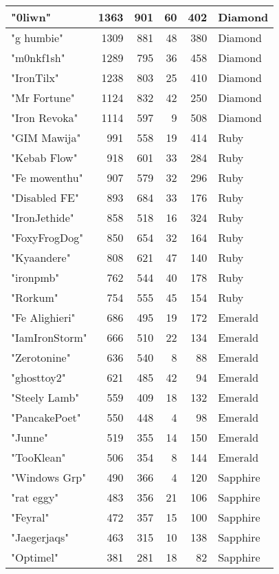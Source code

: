 \documentclass{article}
\begin{document}
\begin{table}[htbp]
\begin{tabular}{|l|r|r|r|r|l|}
"0liwn" & 1363 & 901 & 60 & 402 & Diamond \\ \hline
"g humbie" & 1309 & 881 & 48 & 380 & Diamond \\ \hline
"m0nkf1sh" & 1289 & 795 & 36 & 458 & Diamond \\ \hline
"IronTilx" & 1238 & 803 & 25 & 410 & Diamond \\ \hline
"Mr Fortune" & 1124 & 832 & 42 & 250 & Diamond \\ \hline
"Iron Revoka" & 1114 & 597 & 9 & 508 & Diamond \\ \hline
"GIM Mawija" & 991 & 558 & 19 & 414 & Ruby \\ \hline
"Kebab Flow" & 918 & 601 & 33 & 284 & Ruby \\ \hline
"Fe mowenthu" & 907 & 579 & 32 & 296 & Ruby \\ \hline
"Disabled FE" & 893 & 684 & 33 & 176 & Ruby \\ \hline
"IronJethide" & 858 & 518 & 16 & 324 & Ruby \\ \hline
"FoxyFrogDog" & 850 & 654 & 32 & 164 & Ruby \\ \hline
"Kyaandere" & 808 & 621 & 47 & 140 & Ruby \\ \hline
"ironpmb" & 762 & 544 & 40 & 178 & Ruby \\ \hline
"Rorkum" & 754 & 555 & 45 & 154 & Ruby \\ \hline
"Fe Alighieri" & 686 & 495 & 19 & 172 & Emerald \\ \hline
"IamIronStorm" & 666 & 510 & 22 & 134 & Emerald \\ \hline
"Zerotonine" & 636 & 540 & 8 & 88 & Emerald \\ \hline
"ghosttoy2" & 621 & 485 & 42 & 94 & Emerald \\ \hline
"Steely Lamb" & 559 & 409 & 18 & 132 & Emerald \\ \hline
"PancakePoet" & 550 & 448 & 4 & 98 & Emerald \\ \hline
"Junne" & 519 & 355 & 14 & 150 & Emerald \\ \hline
"TooKlean" & 506 & 354 & 8 & 144 & Emerald \\ \hline
"Windows Grp" & 490 & 366 & 4 & 120 & Sapphire \\ \hline
"rat eggy" & 483 & 356 & 21 & 106 & Sapphire \\ \hline
"Feyral" & 472 & 357 & 15 & 100 & Sapphire \\ \hline
"Jaegerjaqs" & 463 & 315 & 10 & 138 & Sapphire \\ \hline
"Optimel" & 381 & 281 & 18 & 82 & Sapphire \\ \hline

\end{tabular}
\end{table}
\end{document}
